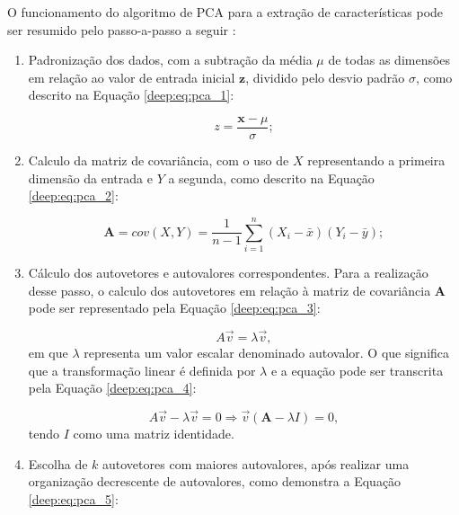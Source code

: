 O funcionamento do algoritmo de PCA para a extração de características pode ser resumido pelo passo-a-passo a seguir \citep{Song2010FeatureAnalysis}:

\begin{enumerate}
    \item Padronização dos dados, com a subtração da média $\mu$ de todas as dimensões em relação ao valor de entrada inicial $\boldsymbol{z}$, dividido pelo desvio padrão $\sigma$, como descrito na Equação \ref{deep:eq:pca_1}:

    \begin{equation}
        \label{deep:eq:pca_1}
        z = \frac{\boldsymbol{x} - \mu}{\sigma};
    \end{equation}

    \item Calculo da matriz de covariância, com o uso de  $X$ representando a primeira dimensão da entrada e $Y$ a segunda, como descrito na Equação \ref{deep:eq:pca_2}: 

    \begin{equation}
        \label{deep:eq:pca_2}
        \boldsymbol{A} = cov(X, Y) = \frac{1}{n-1} \sum_{i=1}^{n} (X_i - \bar{x}) (Y_i - \bar{y});
    \end{equation}

    \item Cálculo dos autovetores e autovalores correspondentes. Para a realização desse passo, o calculo dos autovetores em relação à matriz de covariância $\boldsymbol{A}$ pode ser representado pela Equação \ref{deep:eq:pca_3}:

    \begin{equation}
        \label{deep:eq:pca_3}
        A\overrightarrow{v} = \lambda\overrightarrow{v},
    \end{equation}
    em que $\lambda$ representa um valor escalar denominado autovalor. O que significa que a transformação linear é definida por $\lambda$ e a equação pode ser transcrita pela Equação \ref{deep:eq:pca_4}:

        \begin{equation}
        \label{deep:eq:pca_4}
        A\overrightarrow{v} - \lambda\overrightarrow{v} = 0
        \Rightarrow \overrightarrow{v}(\boldsymbol{A} - \lambda I) = 0,
    \end{equation}
    tendo $I$ como uma matriz identidade.

    \item Escolha de $k$ autovetores com maiores autovalores, após realizar uma organização decrescente de autovalores, como demonstra a Equação \ref{deep:eq:pca_5}:


\end{enumerate}
